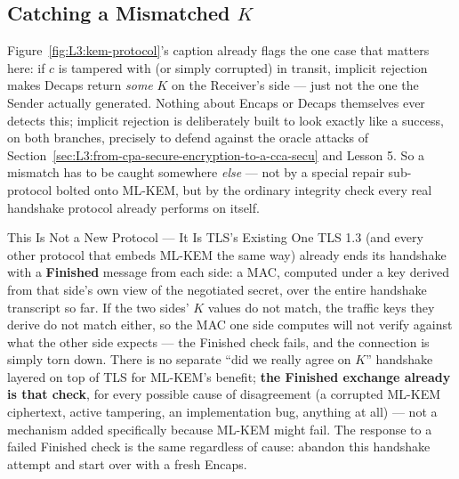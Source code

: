 \subsection{Catching a Mismatched \texorpdfstring{$K$}{K}}
\label{sec:L3:key-confirmation}

Figure~\ref{fig:L3:kem-protocol}'s caption already flags the one case that matters here: if $c$ is tampered with (or simply corrupted) in transit, implicit rejection makes Decaps return \emph{some} $K$ on the Receiver's side --- just not the one the Sender actually generated. Nothing about Encaps or Decaps themselves ever detects this; implicit rejection is deliberately built to look exactly like a success, on both branches, precisely to defend against the oracle attacks of Section~\ref{sec:L3:from-cpa-secure-encryption-to-a-cca-secu} and Lesson 5. So a mismatch has to be caught somewhere \emph{else} --- not by a special repair sub-protocol bolted onto ML-KEM, but by the ordinary integrity check every real handshake protocol already performs on itself.

\begin{rmkbox}{This Is Not a New Protocol --- It Is TLS's Existing One}
TLS 1.3 (and every other protocol that embeds ML-KEM the same way) already ends its handshake with a \textbf{Finished} message from each side: a MAC, computed under a key derived from that side's own view of the negotiated secret, over the entire handshake transcript so far. If the two sides' $K$ values do not match, the traffic keys they derive do not match either, so the MAC one side computes will not verify against what the other side expects --- the Finished check fails, and the connection is simply torn down. There is no separate ``did we really agree on $K$'' handshake layered on top of TLS for ML-KEM's benefit; \textbf{the Finished exchange already is that check}, for every possible cause of disagreement (a corrupted ML-KEM ciphertext, active tampering, an implementation bug, anything at all) --- not a mechanism added specifically because ML-KEM might fail. The response to a failed Finished check is the same regardless of cause: abandon this handshake attempt and start over with a fresh Encaps.
\end{rmkbox}

